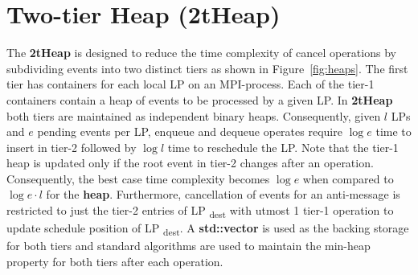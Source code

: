 \section{Two-tier Heap (2tHeap)} 
The \textbf{2tHeap} is designed to reduce the time complexity of cancel operations by subdividing events into two distinct tiers as shown in Figure~\ref{fig:heaps}. The first tier has containers for each local LP on an MPI-process. Each of the tier-1 containers contain a heap of events to be processed by a given LP. In \textbf{2tHeap} both tiers are maintained as independent binary heaps. Consequently, given $l$ LPs and $e$ pending events per LP, enqueue and dequeue operates require
$\log e$ time to insert in tier-2 followed by $\log l$ time to reschedule the LP. Note that the tier-1 heap is updated only if the root event in tier-2 changes after an operation. Consequently, the best case time complexity becomes $\log e$ when compared to $\log e\cdot l$ for the \textbf{heap}. Furthermore, cancellation of events for an anti-message is restricted to just the tier-2 entries of LP \textsubscript{dest}  with utmost 1 tier-1 operation to update schedule position of LP \textsubscript{dest}. A \textbf{std::vector} is used as the backing storage for both tiers and standard algorithms are used to maintain the min-heap property for both tiers after each operation.


